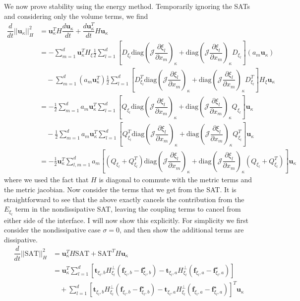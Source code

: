\documentclass[12pt,a4paper]{article}
\newcommand{\pder}[2][]{\dfrac{\partial #1}{\partial #2}} %
\newcommand{\der}[2][]{\dfrac{d #1}{d #2}} %
\newcommand{\norm}[1]{\left\vert \left\vert #1 \right\vert \right\vert} %
\newcommand{\fn}[1]{\mathcal{#1}} %
\begin{document}
We now prove stability using the energy method. Temporarily ignoring the SATs and considering only the volume terms, we find
\begin{align*}
\der{t} \norm{ \bm{u}_\kappa }^2_{H} &= \bm{u}^T_\kappa H  \der[\bm{u}_\kappa]{t} + \der[\bm{u}_\kappa^T]{t} H  \bm{u}_\kappa \\
&= - \sum_{m=1}^d \bm{u}^T_\kappa H_\xi \frac{1}{2} \sum_{l=1}^d \left[ D_{\xi_l} \text{diag} \left( \fn{J} \pder[\xi_l]{x_m} \right)_\kappa + \text{diag} \left( \fn{J} 
 \pder[\xi_l]{x_m} \right)_\kappa  D_{\xi_l} \right] \left( a_m \bm{u}_\kappa \right) \\
 & \quad - \sum_{m=1}^d \left( a_m \bm{u}_\kappa^T \right) \frac{1}{2} \sum_{l=1}^d \left[ D_{\xi_l}^T \text{diag} \left( \fn{J} \pder[\xi_l]{x_m} \right)_\kappa + \text{diag} \left( \fn{J}  \pder[\xi_l]{x_m} \right)_\kappa  D_{\xi_l}^T \right]  H_\xi  \bm{u}_\kappa \\
 &= - \frac{1}{2} \sum_{m=1}^d a_m \bm{u}^T_\kappa \sum_{l=1}^d \left[ Q_{\xi_l} \text{diag} \left( \fn{J} \pder[\xi_l]{x_m} \right)_\kappa + \text{diag} \left( \fn{J} 
 \pder[\xi_l]{x_m} \right)_\kappa  Q_{\xi_l} \right]  \bm{u}_\kappa  \\
 & \quad - \frac{1}{2} \sum_{m=1}^d a_m \bm{u}_\kappa^T \sum_{l=1}^d \left[ Q_{\xi_l}^T \text{diag} \left( \fn{J} \pder[\xi_l]{x_m} \right)_\kappa + \text{diag} \left( \fn{J}  \pder[\xi_l]{x_m} \right)_\kappa  Q_{\xi_l}^T \right]  \bm{u}_\kappa \\
&= - \frac{1}{2} \bm{u}_\kappa^T \sum_{l,m=1}^d a_m \left[ \left( Q_{\xi_l} + Q_{\xi_l}^T \right) \text{diag} \left( \fn{J} \pder[\xi_l]{x_m} \right)_\kappa + \text{diag} \left( \fn{J} \pder[\xi_l]{x_m} \right)_\kappa \left( Q_{\xi_l} + Q_{\xi_l}^T \right) \right] \bm{u}_\kappa
\end{align*}
where we used the fact that $H$ is diagonal to commute with the metric terms and the metric jacobian. Now consider the terms that we get from the SAT. It is straightforward to see that the above exactly cancels the contribution from the $E_{\xi_l}$ term in the nondissipative SAT, leaving the coupling terms to cancel from either side of the interface. I will now show this explicitly. For simplicity we first consider the nondissipative case $\sigma = 0$, and then show the additional terms are dissipative.
\begin{align*}
\der{t} \norm{ \text{SAT} }^2_{H} &= \bm{u}^T_\kappa H  \text{SAT} + \text{SAT}^T H  \bm{u}_\kappa \\
&= \bm{u}^T_\kappa \sum_{l = 1}^d \left[  \bm{t}_{\xi_l,b} H^{\bot}_{\xi_l} \left(\bm{f}_{\xi_l,b} - \bm{f}^\star_{\xi_l,b} \right)  - \bm{t}_{\xi_l,a} H^{\bot}_{\xi_l} \left(\bm{f}_{\xi_l,a} - \bm{f}^\star_{\xi_l,a}  \right) \right] \\
& \quad  + \sum_{l = 1}^d \left[  \bm{t}_{\xi_l,b} H^{\bot}_{\xi_l} \left(\bm{f}_{\xi_l,b} - \bm{f}^\star_{\xi_l,b} \right)  - \bm{t}_{\xi_l,a} H^{\bot}_{\xi_l} \left(\bm{f}_{\xi_l,a} - \bm{f}^\star_{\xi_l,a}  \right) \right]^T  \bm{u} _\kappa
\end{align*}
\end{document}
